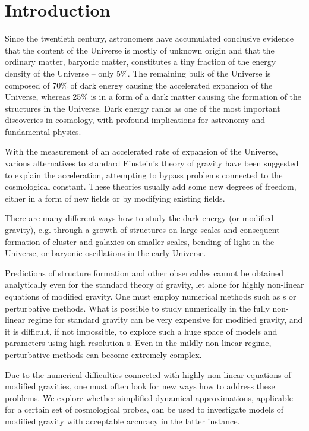 \chapter*{Introduction}
Since the twentieth century, astronomers have accumulated conclusive evidence that the content of the Universe is mostly of unknown origin and that the ordinary matter, baryonic matter, constitutes a tiny fraction of the energy density of the Universe -- only 5\%. The remaining bulk of the Universe is composed of 70\% of dark energy causing the accelerated expansion of the Universe, whereas 25\% is in a form of a dark matter causing the formation of the structures in the Universe. Dark energy ranks as one of the most important discoveries in cosmology, with profound implications for astronomy and fundamental physics.

With the measurement of an accelerated rate of expansion of the Universe, various alternatives to standard Einstein's theory of gravity have been suggested to explain the acceleration, attempting to bypass problems connected to the cosmological constant. These theories usually add some new degrees of freedom, either in a form of new fields or by modifying existing fields.

There are many different ways how to study the dark energy (or modified gravity), e.g. through a growth of structures on large scales and consequent formation of cluster and galaxies on smaller scales, bending of light in the Universe, or baryonic oscillations in the early Universe.

Predictions of structure formation and other observables cannot be obtained analytically even for the standard theory of gravity, let alone for highly non-linear equations of modified gravity. One must employ numerical methods such as \nbodysim s or perturbative methods. What is possible to study numerically in the fully non-linear regime for standard gravity can be very expensive for modified gravity, and it is difficult, if not impossible, to explore such a huge space of models and parameters using high-resolution \nbodysim s. Even in the mildly non-linear regime, perturbative methods can become extremely complex.

Due to the numerical difficulties connected with highly non-linear equations of modified gravities, one must often look for new ways how to address these problems. We explore whether simplified dynamical approximations, applicable for a certain set of cosmological probes, can be used to investigate models of modified gravity with acceptable accuracy in the latter instance.

